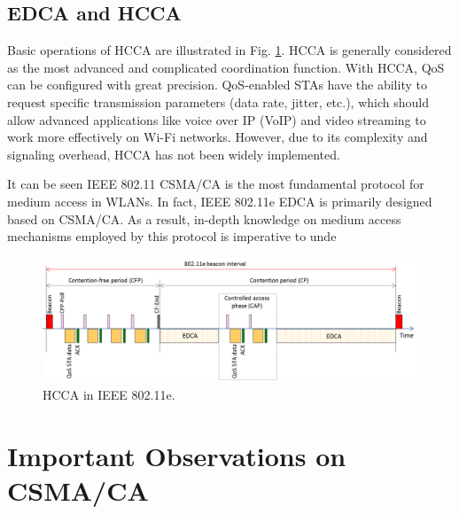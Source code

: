 \subsection{EDCA and HCCA}
\label{edca-hcca}

Basic operations of HCCA are illustrated in Fig. \ref{figs:802-11e-HCCA}. HCCA is generally considered as the most advanced and complicated coordination function. With HCCA, QoS can be configured with great precision. QoS-enabled STAs have the ability to request specific transmission parameters (data rate, jitter, etc.), which should allow advanced applications like voice over IP (VoIP) and video streaming to work more effectively on Wi-Fi networks. However, due to its complexity and signaling overhead, HCCA has not been widely implemented.

It can be seen IEEE 802.11 CSMA/CA is the most fundamental protocol for medium access in WLANs. In fact, IEEE 802.11e EDCA is primarily designed based on CSMA/CA. As a result, in-depth knowledge on medium access mechanisms employed by this protocol is imperative to unde
\begin{figure}[!t]
	\centering
	\includegraphics[width=1.0\columnwidth]{figs/802-11e-HCCA}
	\caption{HCCA in IEEE 802.11e.}
	\label{figs:802-11e-HCCA}
\end{figure}


\section{Important Observations on CSMA/CA}
\label{csmaca-obs}

